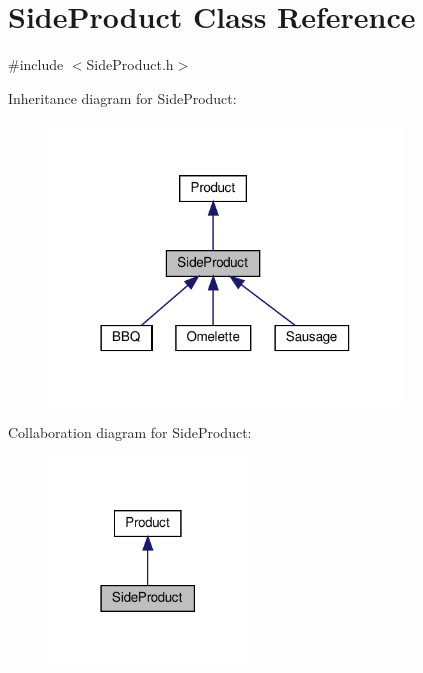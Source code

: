 \hypertarget{classSideProduct}{}\section{Side\+Product Class Reference}
\label{classSideProduct}


{\ttfamily \#include $<$Side\+Product.\+h$>$}



Inheritance diagram for Side\+Product\+:
\nopagebreak
\begin{figure}[H]
\begin{center}
\leavevmode
\includegraphics[width=266pt]{classSideProduct__inherit__graph}
\end{center}
\end{figure}


Collaboration diagram for Side\+Product\+:
\nopagebreak
\begin{figure}[H]
\begin{center}
\leavevmode
\includegraphics[width=150pt]{classSideProduct__coll__graph}
\end{center}
\end{figure}
